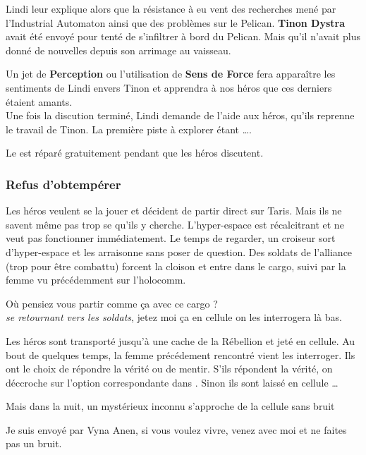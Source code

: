 Lindi leur explique alors que la résistance à eu vent des recherches mené par l'Industrial Automaton ainsi que des problèmes sur le Pelican. \textbf{Tinon Dystra} avait été envoyé pour tenté de s'infiltrer à bord du Pelican. Mais qu'il n'avait plus donné de nouvelles depuis son arrimage au vaisseau.

Un jet de \textbf{Perception} ou l'utilisation de \textbf{Sens de Force} fera apparaître les sentiments de Lindi envers Tinon et apprendra à nos héros que ces derniers étaient amants.\\

Une fois la discution terminé, Lindi demande de l'aide aux héros, qu'ils reprenne le travail de Tinon. La première piste à explorer étant \ldots {}.

Le  est réparé gratuitement pendant que les héros discutent.


\subsubsection{Refus d’obtempérer} \label{sec:refus-d-obtemperer}

Les héros veulent se la jouer et décident de partir direct sur Taris. Mais ils ne savent même pas trop se qu'ils y cherche. L'hyper-espace est récalcitrant et ne veut pas fonctionner immédiatement. Le temps de regarder, un croiseur sort d'hyper-espace et les arraisonne sans poser de question. Des soldats de l'alliance (trop pour être combattu) forcent la cloison et entre dans le cargo, suivi par la femme vu précédemment sur l'holocomm.

\begin{quotebox}
    Où pensiez vous partir comme ça avec ce cargo ? \\
    \emph{se retournant vers les soldats}, jetez moi ça en cellule on les interrogera là bas.
\end{quotebox}

Les héros sont transporté jusqu'à une cache de la Rébellion et jeté en cellule. Au bout de quelques temps, la femme précédement rencontré vient les interroger. Ils ont le choix de répondre la vérité ou de mentir. S'ils répondent la vérité, on déccroche sur l'option correspondante dans . Sinon ils sont laissé en cellule \ldots

Mais dans la nuit, un mystérieux inconnu s'approche de la cellule sans bruit

\begin{quotebox}
    Je suis envoyé par Vyna Anen, si vous voulez vivre, venez avec moi et ne faites pas un bruit.
\end{quotebox}

